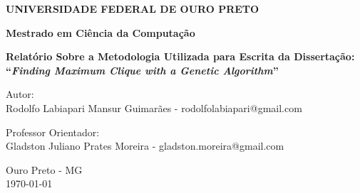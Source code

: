 \documentclass[portugues, brazil, a4paper,12pt]{article}
\begin{document}
\begin{titlepage}
  \vfill

  \begin{center}
    \begin{Large}
      \textbf{UNIVERSIDADE FEDERAL DE OURO PRETO}
    \end{Large}
  \end{center}

  \begin{center}
    \begin{large}
      \textbf{Mestrado em Ciência da Computação} \\[1.4cm] 
    \end{large}
  \end{center}

  \vfill

  \begin{center}
    \begin{large}
      \textbf{Relatório Sobre a Metodologia Utilizada para Escrita da Dissertação: ``\textit{Finding Maximum Clique with a Genetic Algorithm}''} \\[0.4cm] 
    \end{large}
  \end{center}

  \vfill

  \begin{center}
    \begin{large}
      Autor: \\
		Rodolfo Labiapari Mansur Guimarães - rodolfolabiapari@gmail.com
    \end{large}
  \end{center}

	\vfill

  \begin{center}
    \begin{large}
      Professor Orientador: \\
      Gladston Juliano Prates Moreira - gladston.moreira@gmail.com
    \end{large}
  \end{center}

  \vfill

  \begin{center}
    \begin{large}
      Ouro Preto - MG \\
      \today \\
    \end{large}
  \end{center}

\clearpage
\tableofcontents 
\end{titlepage}
\end{document}
